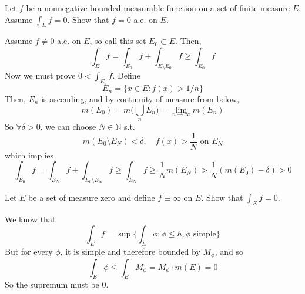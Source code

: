   \begin{exercise}[Royden 4.16]
    Let $f$ be a nonnegative bounded \hyperref[def:measurable-function]{measurable function} on a set of \hyperref[def:finite-measure]{finite measure} $E$. Assume $\int_E f = 0$. Show that $f = 0$ a.e. on $E$.
  \end{exercise}
  \begin{solution}
    Assume $f \neq 0$ a.e. on $E$, so call this set $E_0 \subset E$. Then, 
    \begin{equation}
      \int_E f = \int_{E_0} f + \int_{E \setminus E_0} f \geq \int_{E_0} f
    \end{equation}
    Now we must prove $0 < \int_{E_0} f$. Define 
    \begin{equation}
      E_n = \{x \in E \colon f(x) > 1/n \} 
    \end{equation}
    Then, $E_n$ is ascending, and by \hyperref[thm:continuity-of-measure]{continuity of measure} from below, 
    \begin{equation}
      m(E_0) = m \bigg( \bigcup_n E_n \bigg) = \lim_{n \to \infty} m(E_n) 
    \end{equation}
    So $\forall \delta > 0$, we can choose $N \in \mathbb{N}$ s.t. 
    \begin{equation}
      m (E_0 \setminus E_N) < \delta, \quad f(x) > \frac{1}{N} \text{ on } E_N
    \end{equation}
    which implies 
    \begin{equation}
      \int_{E_0} f = \int_{E_N} f + \int_{E_0 \setminus E_N} f \geq \int_{E_N} f \geq \frac{1}{N} m(E_N) > \frac{1}{N} (m(E_0) - \delta) > 0
    \end{equation}
  \end{solution}

  \begin{exercise}[Royden 4.17]
    Let $E$ be a set of measure zero and define $f \equiv \infty$ on $E$. Show that $\int_E f = 0$.
  \end{exercise}
  \begin{solution}
    We know that 
    \begin{equation}
      \int_E f = \sup \bigg\{ \int_E \phi \colon \phi \leq h, \phi \text{ simple} \bigg\} 
    \end{equation}
    But for every $\phi$, it is simple and therefore bounded by $M_\phi$, and so 
    \begin{equation}
      \int_E \phi \leq \int_E M_\phi = M_\phi \cdot m(E) = 0
    \end{equation}
    So the supremum must be $0$. 
  \end{solution}

